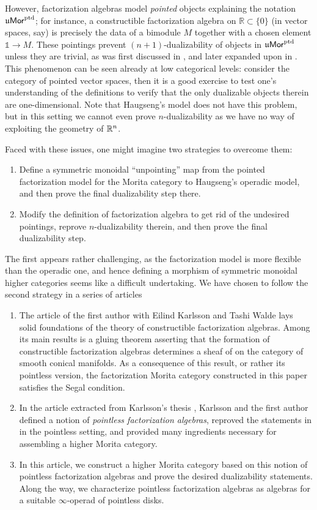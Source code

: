 \documentclass[10pt, reqno, twoside
, final
]{amsart}
\numberwithin{equation}{subsection}%
\theoremstyle{definition}
\theoremstyle{definition}
\theoremstyle{definition}
\theoremstyle{definition}
\theoremstyle{definition}
\theoremstyle{definition}
\theoremstyle{definition}
\theoremstyle{definition}
\theoremstyle{definition}
\theoremstyle{plain}
\theoremstyle{definition}
\theoremstyle{plain}
\theoremstyle{definition}
\theoremstyle{plain}
\theoremstyle{definition}
\theoremstyle{definition}
\theoremstyle{plain}
\theoremstyle{plain}
\theoremstyle{definition}
\theoremstyle{plain}
\theoremstyle{plain}
\theoremstyle{plain}
\begin{document}
However, factorization algebras model {\em pointed} objects explaining the notation $\mathfrak{u}\mathsf{Mor}^{\mathrm{ptd}}$; for instance, a constructible factorization algebra on $\mathbb{R} \subset \{0\}$ (in vector spaces, say) is precisely the data of a bimodule $M$ together with a chosen element $\mathbb{1} \to M$.
These pointings prevent $(n+1)$-dualizability of objects in $\mathfrak{u}\mathsf{Mor}^{\mathrm{ptd}}$ unless they are trivial, as was first discussed in \cite[Theorem 7.3]{Johnson-Freyd}, and later expanded upon in \cite{GS}. This phenomenon can be seen already at low categorical levels: consider the category of pointed vector spaces, then it is a good exercise to test one's understanding of the definitions to verify that the only dualizable objects therein are one-dimensional. Note that Haugseng's model does not have this problem, but in this setting we cannot even prove $n$-dualizability as we have no way of exploiting the geometry of $\mathbb{R}^n$. 

Faced with these issues, one might imagine two strategies to overcome them:
\begin{enumerate}
\item Define a symmetric monoidal ``unpointing'' map from the pointed factorization model for the Morita category to Haugseng's operadic model, and then prove the final dualizability step there.
\item Modify the definition of factorization algebra to get rid of the undesired pointings, reprove $n$-dualizability therein, and then prove the final dualizability step.
\end{enumerate}
The first appears rather challenging, as the factorization model is more flexible than the operadic one, and hence defining a morphism of symmetric monoidal higher categories seems like a difficult undertaking. We have chosen to follow the second strategy in a series of articles
\begin{enumerate}[$(I)$]
    \item The article \cite{KSW} of the first author with Eilind Karlsson and Tashi Walde lays solid foundations of the theory of constructible factorization algebras. Among its main results is a gluing theorem asserting that the formation of constructible factorization algebras determines a sheaf of \infcats on the category of smooth conical manifolds. As a consequence of this result, or rather its pointless version, the factorization Morita category constructed in this paper satisfies the Segal condition. 
    \item In the article \cite{KS} extracted from Karlsson's thesis \cite{Karlssonthesis}, Karlsson and the first author defined a notion of {\em pointless factorization algebras}, reproved the statements in \cite{KSW} in the pointless setting, and provided many ingredients necessary for assembling a higher Morita category.
    \item In this article, we construct a higher Morita category based on this notion of pointless factorization algebras and prove the desired dualizability statements. Along the way, we characterize pointless factorization algebras as algebras for a suitable $\infty$-operad of pointless disks.    
\end{enumerate}
\end{document}
